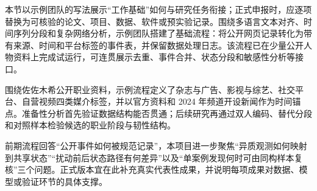 \GXNSFBodyText

本节以示例团队的写法展示“工作基础”如何与研究任务衔接；正式申报时，应逐项替换为可核验的论文、项目、数据、软件或预实验记录。围绕多语言文本对齐、时间序列分段和复杂网络分析，示例团队搭建了基础流程：将公开网页记录转化为带有来源、时间和平台标签的事件表，并保留数据处理日志。该流程已在少量公开人物资料上完成试运行，可连贯展示去重、事件合并、状态分段和敏感性分析等接口。

围绕佐佐木希公开职业资料，示例流程定义了杂志与广告、影视与综艺、社交平台、自营视频四类媒介标签，并以官方资料和 2024 年频道开设新闻作为时间锚点。准备性分析首先验证数据结构能否贯通；后续研究再通过双人编码、替代分段和对照样本检验候选的职业阶段与韧性结构。

前期流程回答“公开事件如何被规范记录”，本项目进一步聚焦“异质观测如何映射到共享状态”“扰动前后状态路径有何差异”以及“单案例发现何时可由同构样本复核”三个问题。正式版本宜在此补充真实代表性成果，并说明每项成果对数据、模型或验证环节的具体支撑。

